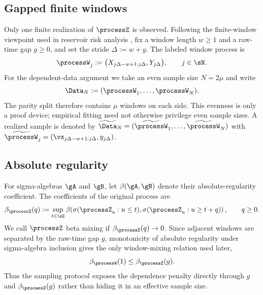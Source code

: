 \subsection{Gapped finite windows}

Only one finite realization of $\processZ$ is observed.  Following the
finite-window viewpoint used in reservoir risk analysis
\citep{GononGrigoryevaOrtega2020}, fix a window length $w\geq1$ and a raw-time
gap $g\geq0$, and set the stride $\Delta:=w+g$.  The labeled window process is
\begin{equation}
    \processW_j:=\bigl(X_{j\Delta-w+1:j\Delta},Y_{j\Delta}\bigr),
    \qquad j\in\sN.
    \label{eq:gapped-window-process}
\end{equation}
For the dependent-data argument we take an even sample size $N=2\mu$ and
write
\begin{equation}
    \Data_N:=(\processW_1,\ldots,\processW_N).
    \label{eq:even-window-sample}
\end{equation}
The parity split therefore contains $\mu$ windows on each side.  This evenness
is only a proof device; empirical fitting need not otherwise privilege even
sample sizes.  A realized sample is denoted by
$\widetilde\Data_N=(\widetilde\processW_1,\ldots,\widetilde\processW_N)$ with
$\widetilde\processW_j=(\vx_{j\Delta-w+1:j\Delta},y_{j\Delta})$.

\subsection{Absolute regularity}

For sigma-algebras $\gA$ and $\gB$, let $\beta(\gA,\gB)$ denote their
absolute-regularity coefficient.  The coefficients of the original process
are
\begin{equation}
    \beta_{\processZ}(q)
    :=\sup_{t\in\sZ}
      \beta\!\left(\sigma(\processZ_u:u\leq t),
                   \sigma(\processZ_u:u\geq t+q)\right),
    \qquad q\geq0.
    \label{eq:beta-original-process}
\end{equation}
We call $\processZ$ beta mixing if $\beta_{\processZ}(q)\to0$.  Since adjacent
windows are separated by the raw-time gap $g$, monotonicity of absolute
regularity under sigma-algebra inclusion gives the only window-mixing relation
used later,
\begin{equation}
    \beta_{\processW}(1)\leq\beta_{\processZ}(g).
    \label{eq:adjacent-window-mixing}
\end{equation}
Thus the sampling protocol exposes the dependence penalty directly through
$g$ and $\beta_{\processZ}(g)$ rather than hiding it in an effective sample
size.
